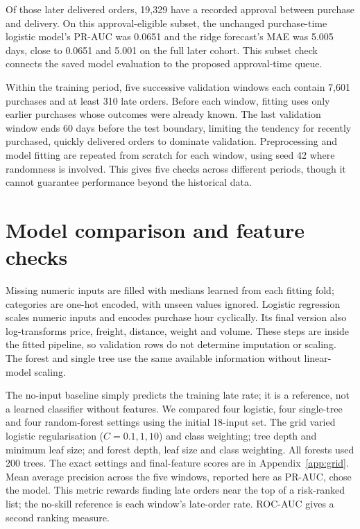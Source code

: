 \documentclass[12pt,a4paper]{article}
\begin{document}
Of those later delivered orders, 19,329 have a recorded approval between purchase and delivery. On this approval-eligible subset, the unchanged purchase-time logistic model's PR-AUC was 0.0651 and the ridge forecast's MAE was 5.005 days, close to 0.0651 and 5.001 on the full later cohort. This subset check connects the saved model evaluation to the proposed approval-time queue.

Within the training period, five successive validation windows each contain 7,601 purchases and at least 310 late orders. Before each window, fitting uses only earlier purchases whose outcomes were already known. The last validation window ends 60 days before the test boundary, limiting the tendency for recently purchased, quickly delivered orders to dominate validation. Preprocessing and model fitting are repeated from scratch for each window, using seed 42 where randomness is involved. This gives five checks across different periods, though it cannot guarantee performance beyond the historical data.

\section*{Model comparison and feature checks}
Missing numeric inputs are filled with medians learned from each fitting fold; categories are one-hot encoded, with unseen values ignored. Logistic regression scales numeric inputs and encodes purchase hour cyclically. Its final version also log-transforms price, freight, distance, weight and volume. These steps are inside the fitted pipeline, so validation rows do not determine imputation or scaling. The forest and single tree use the same available information without linear-model scaling.

The no-input baseline simply predicts the training late rate; it is a reference, not a learned classifier without features. We compared four logistic, four single-tree and four random-forest settings using the initial 18-input set. The grid varied logistic regularisation ($C=0.1,1,10$) and class weighting; tree depth and minimum leaf size; and forest depth, leaf size and class weighting. All forests used 200 trees. The exact settings and final-feature scores are in Appendix~\ref{app:grid}. Mean average precision across the five windows, reported here as PR-AUC, chose the model. This metric rewards finding late orders near the top of a risk-ranked list; the no-skill reference is each window's late-order rate. ROC-AUC gives a second ranking measure.
\end{document}
